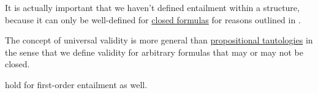 \begin{comments}
  \item It is actually important that we haven't defined entailment within a structure, because it can only be well-defined for \hyperref[def:first_order_syntax/closed_formula]{closed formulas} for reasons outlined in .

  \item The concept of universal validity is more general than \hyperref[def:propositional_tautology]{propositional tautologies} in the sense that we define validity for arbitrary formulas that may or may not be closed.

  \item {} hold for first-order entailment as well.
\end{comments}


